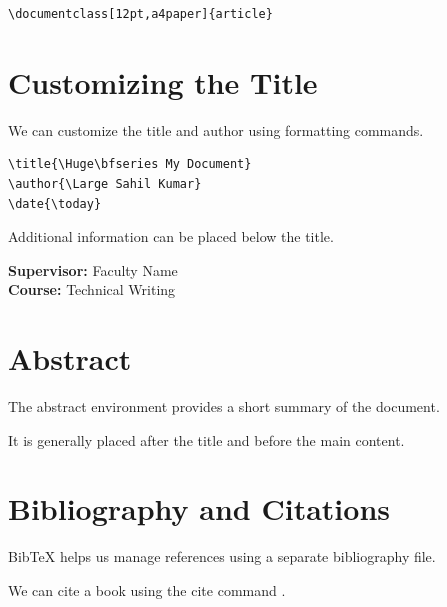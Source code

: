 \documentclass[12pt,a4paper]{article}
\begin{document}
\begin{verbatim}
\documentclass[12pt,a4paper]{article}
\end{verbatim}

\section{Customizing the Title}

We can customize the title and author using
formatting commands.

\begin{verbatim}
\title{\Huge\bfseries My Document}
\author{\Large Sahil Kumar}
\date{\today}
\end{verbatim}

Additional information can be placed below the title.

\begin{center}
    \textbf{Supervisor:} Faculty Name \\
    \textbf{Course:} Technical Writing
\end{center}

\section{Abstract}

The abstract environment provides a short summary
of the document.

It is generally placed after the title and before
the main content.

\section{Bibliography and Citations}

BibTeX helps us manage references using a
separate bibliography file.

We can cite a book using the cite command
\cite{kn:gnus}.



\end{document}
